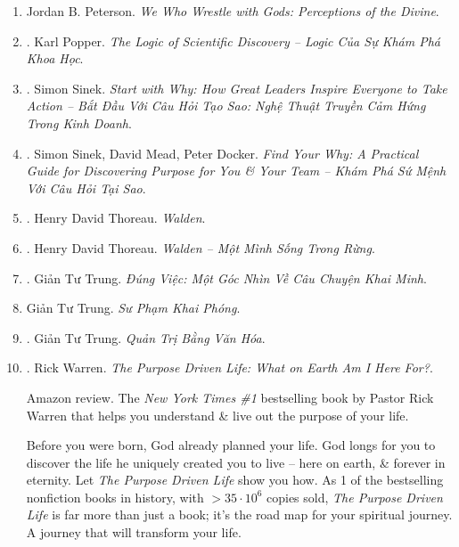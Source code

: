 \documentclass{article}
\begin{document}
\begin{enumerate}
	\item {\sc Jordan B. Peterson}. {\it We Who Wrestle with Gods: Perceptions of the Divine}.
	
	\item \cite{Popper_logic_khoa_hoc}. {\sc Karl Popper}. {\it The Logic of Scientific Discovery -- Logic Của Sự Khám Phá Khoa Học}.\hfill{\sf[done]}
	
	\item \cite{Sinek_start_why}. {\sc Simon Sinek}. {\it Start with Why: How Great Leaders Inspire Everyone to Take Action -- Bắt Đầu Với Câu Hỏi Tạo Sao: Nghệ Thuật Truyền Cảm Hứng Trong Kinh Doanh}.\hfill{\sf[done]}
	
	\item \cite{Sinek_Mead_Docker_why}. {\sc Simon Sinek, David Mead, Peter Docker}. {\it Find Your Why: A Practical Guide for Discovering Purpose for You \& Your Team -- Khám Phá Sứ Mệnh Với Câu Hỏi Tại Sao}.\hfill{\sf[done]}
	
	\item \cite{Thoreau_Walden}. {\sc Henry David Thoreau}. {\it Walden}.\hfill{\sf[reading]}
	
	\item \cite{Thoreau_Walden_VN}. {\sc Henry David Thoreau}. {\it Walden -- Một Mình Sống Trong Rừng}.\hfill{\sf[done]}
	
	\item \cite{Trung_dung_viec}. {\sc Giản Tư Trung}. {\it Đúng Việc: Một Góc Nhìn Về Câu Chuyện Khai Minh}.\hfill{\sf[done]}
	
	\item {\sc Giản Tư Trung}. {\it Sư Phạm Khai Phóng}.
	
	\item \cite{Trung_van_hoa}. {\sc Giản Tư Trung}. {\it Quản Trị Bằng Văn Hóa}.\hfill{\sf[reading]}
	
	\item \cite{Warren_purpose_driven_life}. {\sc Rick Warren}. {\it The Purpose Driven Life: What on Earth Am I Here For?}. {}
	
	{\sf Amazon review.} The {\it New York Times \#1} bestselling book by Pastor {\sc Rick Warren} that helps you understand \& live out the purpose of your life.
	
	Before you were born, God already planned your life. God longs for you to discover the life he uniquely created you to live -- here on earth, \& forever in eternity. Let {\it The Purpose Driven Life} show you how. As 1 of the bestselling nonfiction books in history, with $> 35\cdot10^6$ copies sold, {\it The Purpose Driven Life} is far more than just a book; it's the road map for your spiritual journey. A journey that will transform your life.
	

\end{enumerate}
\end{document}
